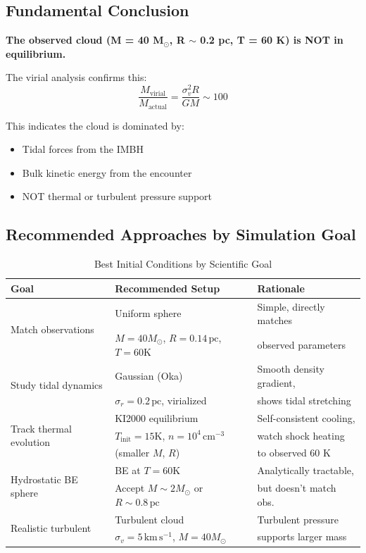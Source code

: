 \documentclass[11pt,a4paper]{article}
\newcommand{\Msun}{M_\odot}
\newcommand{\kms}{\,\mathrm{km\,s^{-1}}}
\newcommand{\pc}{\,\mathrm{pc}}
\newcommand{\cmcubed}{\,\mathrm{cm^{-3}}}
\begin{document}
\subsection{Fundamental Conclusion}

\textbf{The observed cloud (M = 40 M$_\odot$, R $\sim$ 0.2 pc, T = 60 K) is NOT in equilibrium.}

The virial analysis confirms this:
\begin{equation}
    \frac{M_\mathrm{virial}}{M_\mathrm{actual}} = \frac{\sigma_v^2 R}{G M} \sim 100
\end{equation}

This indicates the cloud is dominated by:
\begin{itemize}
    \item Tidal forces from the IMBH
    \item Bulk kinetic energy from the encounter
    \item NOT thermal or turbulent pressure support
\end{itemize}

\subsection{Recommended Approaches by Simulation Goal}

\begin{table}[h]
\centering
\caption{Best Initial Conditions by Scientific Goal}
\begin{tabular}{lll}
\toprule
\textbf{Goal} & \textbf{Recommended Setup} & \textbf{Rationale} \\
\midrule
\multirow{2}{*}{Match observations} & Uniform sphere & Simple, directly matches \\
 & $M=40\Msun$, $R=0.14\pc$, $T=60\mathrm{K}$ & observed parameters \\
\midrule
\multirow{2}{*}{Study tidal dynamics} & Gaussian (Oka) & Smooth density gradient, \\
 & $\sigma_r = 0.2\pc$, virialized & shows tidal stretching \\
\midrule
\multirow{3}{*}{Track thermal evolution} & KI2000 equilibrium & Self-consistent cooling, \\
 & $T_\mathrm{init} = 15\mathrm{K}$, $n = 10^4\cmcubed$ & watch shock heating \\
 & (smaller $M$, $R$) & to observed 60 K \\
\midrule
\multirow{2}{*}{Hydrostatic BE sphere} & BE at $T=60\mathrm{K}$ & Analytically tractable, \\
 & Accept $M \sim 2\Msun$ or $R \sim 0.8\pc$ & but doesn't match obs. \\
\midrule
\multirow{2}{*}{Realistic turbulent} & Turbulent cloud & Turbulent pressure \\
 & $\sigma_v = 5\kms$, $M=40\Msun$ & supports larger mass \\
\bottomrule
\end{tabular}
\end{table}
\end{document}
